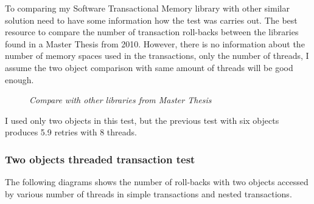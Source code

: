 \documentclass[12pt]{article}
\begin{document}
\newpage
To comparing my Software Transactional Memory library with other similar solution need to have some information how the test was carries out. The best resource to compare the number of transaction roll-backs between the libraries found in a Master Thesis\cite{Performance}  from 2010. However, there is no information about the number of memory spaces used in the transactions, only the number of threads, I assume the two object comparison with same amount of threads will be good enough.
\begin{figure}[h!]%
    \centering
    \qquad
    \caption*{\textit{\color{gray}Compare with other libraries from Master Thesis\cite{Performance}}}%
    \label{fig:example}%
\end{figure}

I used only two objects in this test, but the previous test with six objects produces 5.9 retries with 8 threads. 

\subsubsection{Two objects threaded transaction test}
The following diagrams shows the number of roll-backs with two objects accessed by various number of threads in simple transactions and nested transactions.
\end{document}
